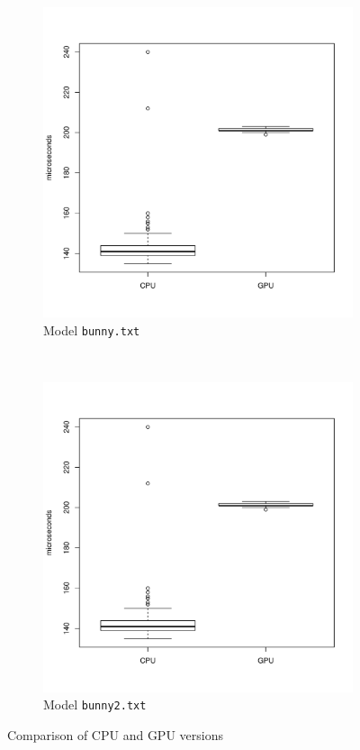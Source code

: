 \begin{figure}
		\begin{subfigure}[b]{0.45\textwidth}
			\includegraphics[width=\textwidth]{results/bunny}
			\caption{Model \texttt{bunny.txt}}
		\end{subfigure}
		~%
		\begin{subfigure}[b]{0.45\textwidth}
			\includegraphics[width=\textwidth]{results/bunny}
			\caption{Model \texttt{bunny2.txt}}
		\end{subfigure}
		\caption{Comparison of CPU and GPU versions}
		\label{fig:results}
	\end{figure}
